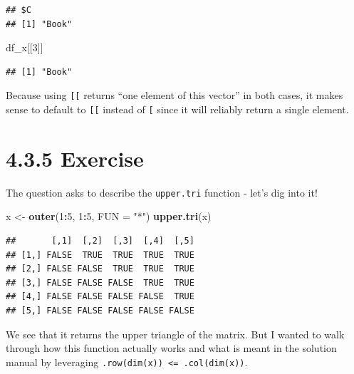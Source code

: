 \documentclass[]{book}
\newenvironment{Shaded}{\begin{snugshade}}{\end{snugshade}}
\newcommand{\DataTypeTok}[1]{\textcolor[rgb]{0.13,0.29,0.53}{#1}}
\newcommand{\DecValTok}[1]{\textcolor[rgb]{0.00,0.00,0.81}{#1}}
\newcommand{\KeywordTok}[1]{\textcolor[rgb]{0.13,0.29,0.53}{\textbf{#1}}}
\newcommand{\NormalTok}[1]{#1}
\newcommand{\OperatorTok}[1]{\textcolor[rgb]{0.81,0.36,0.00}{\textbf{#1}}}
\newcommand{\StringTok}[1]{\textcolor[rgb]{0.31,0.60,0.02}{#1}}
\begin{document}
\begin{verbatim}
## $C
## [1] "Book"
\end{verbatim}

\begin{Shaded}
\begin{Highlighting}[]
\NormalTok{df_x[[}\DecValTok{3}\NormalTok{]]}
\end{Highlighting}
\end{Shaded}

\begin{verbatim}
## [1] "Book"
\end{verbatim}

Because using \texttt{{[}{[}} returns ``one element of this vector'' in both cases, it makes sense to default to \texttt{{[}{[}} instead of \texttt{{[}} since it will reliably return a single element.

\hypertarget{exercise-1}{%
\section*{4.3.5 Exercise}\label{exercise-1}}

The question asks to describe the \texttt{upper.tri} function - let's dig into it!

\begin{Shaded}
\begin{Highlighting}[]
\NormalTok{x <-}\StringTok{ }\KeywordTok{outer}\NormalTok{(}\DecValTok{1}\OperatorTok{:}\DecValTok{5}\NormalTok{, }\DecValTok{1}\OperatorTok{:}\DecValTok{5}\NormalTok{, }\DataTypeTok{FUN =} \StringTok{"*"}\NormalTok{)}
\KeywordTok{upper.tri}\NormalTok{(x)}
\end{Highlighting}
\end{Shaded}

\begin{verbatim}
##       [,1]  [,2]  [,3]  [,4]  [,5]
## [1,] FALSE  TRUE  TRUE  TRUE  TRUE
## [2,] FALSE FALSE  TRUE  TRUE  TRUE
## [3,] FALSE FALSE FALSE  TRUE  TRUE
## [4,] FALSE FALSE FALSE FALSE  TRUE
## [5,] FALSE FALSE FALSE FALSE FALSE
\end{verbatim}

We see that it returns the upper triangle of the matrix. But I wanted to walk through how this function actually works and what is meant in the solution manual by leveraging \texttt{.row(dim(x))\ \textless{}=\ .col(dim(x))}.
\end{document}
